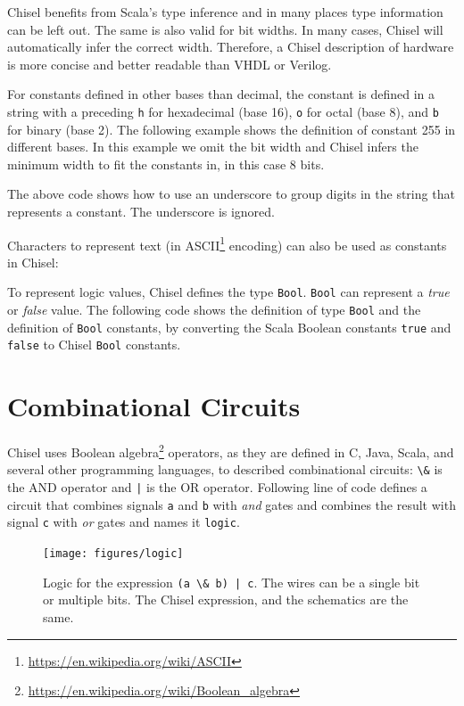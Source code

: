 \documentclass[%
    10pt,
    headinclude, footexclude,
    openright, %
    notitlepage,
    cleardoubleempty,
    headsepline,
    pointlessnumbers,
    bibtotoc, idxtotoc,
    ]{scrbook}
\newcommand{\code}[1]{{\lstinline[basicstyle=\small\ttfamily]{#1}}}
\newcommand{\myref}[2]{\href{#1}{#2}}
\renewcommand{\myref}[2]{{#2}{\footnote{\url{#1}}}}
\begin{document}
Chisel benefits from Scala's type inference and in many places type information can be left out.
The same is also valid for bit widths. In many cases, Chisel will automatically infer the correct width.
Therefore, a Chisel description of hardware is more concise and better readable than VHDL or
Verilog.

For constants defined in other bases than decimal, the constant is defined in a string with
a preceding \code{h} for hexadecimal (base 16), \code{o} for octal (base 8), and \code{b}
for binary (base 2). The following example shows the definition of constant 255 in different
bases. In this example we omit the bit width and Chisel infers the minimum width to fit
the constants in, in this case 8 bits.


\noindent The above code shows how to use an underscore to group digits in the
string that represents a constant. The underscore is ignored.

Characters to represent text (in \myref{https://en.wikipedia.org/wiki/ASCII}{ASCII} encoding)
can also be used as constants in Chisel:



To represent logic values, Chisel defines the type \code{Bool}.
\code{Bool} can represent a \emph{true} or \emph{false} value.
The following code shows the definition of type \code{Bool} and the definition of
\code{Bool} constants, by converting the Scala Boolean constants \code{true}
and \code{false} to Chisel \code{Bool} constants.



\section{Combinational Circuits}

Chisel uses \myref{https://en.wikipedia.org/wiki/Boolean_algebra}{Boolean algebra} operators,
as they are defined in C, Java, Scala, and several other programming languages,
to described combinational circuits: \code{\&} is the AND operator and \code{|} is
the OR operator.
Following line of code defines a circuit that combines signals \code{a} and \code{b} with \emph{and}
gates and combines the result with signal \code{c} with \emph{or} gates and names it \code{logic}.


\begin{figure}
  \centering
  \texttt{[image: figures/logic]}
  \caption{Logic for the expression \code{(a \& b) | c}.
  The wires can be a single bit or multiple bits. The Chisel expression, and the schematics are the same.}
  \label{fig:logic}
\end{figure}
\end{document}
